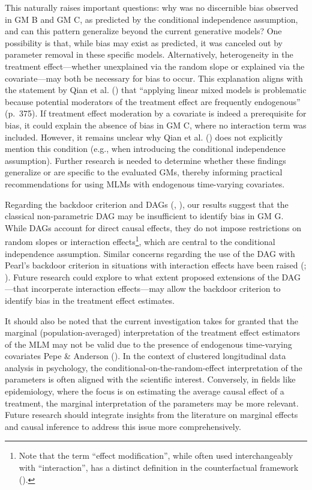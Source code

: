 \documentclass[
  11pt,
  a4paper,
]{article}
\begin{document}
This naturally raises important questions: why was no discernible bias
observed in GM B and GM C, as predicted by the conditional independence
assumption, and can this pattern generalize beyond the current
generative models? One possibility is that, while bias may exist as
predicted, it was canceled out by parameter removal in these specific
models. Alternatively, heterogeneity in the treatment effect---whether
unexplained via the random slope or explained via the covariate---may
both be necessary for bias to occur. This explanation aligns with the
statement by Qian et al. () that ``applying
linear mixed models is problematic because potential moderators of the
treatment effect are frequently endogenous'' (p.~375). If treatment
effect moderation by a covariate is indeed a prerequisite for bias, it
could explain the absence of bias in GM C, where no interaction term was
included. However, it remains unclear why Qian et al.
() does not explicitly mention this
condition (e.g., when introducing the conditional independence
assumption). Further research is needed to determine whether these
findings generalize or are specific to the evaluated GMs, thereby
informing practical recommendations for using MLMs with endogenous
time-varying covariates.

Regarding the backdoor criterion and DAGs
(, ),
our results suggest that the classical non-parametric DAG may be
insufficient to identify bias in GM G. While DAGs account for direct
causal effects, they do not impose restrictions on random slopes or
interaction effects\footnote{Note that the term ``effect modification'',
  while often used interchangeably with ``interaction'', has a distinct
  definition in the counterfactual framework
  ().}, which are
central to the conditional independence assumption. Similar concerns
regarding the use of the DAG with Pearl's backdoor criterion in
situations with interaction effects have been raised
(;
). Future research could
explore to what extent proposed extensions of the DAG---that incorperate
interaction effects---may allow the backdoor criterion to identify bias
in the treatment effect estimates.

It should also be noted that the current investigation takes for granted
that the marginal (population-averaged) interpretation of the treatment
effect estimators of the MLM may not be valid due to the presence of
endogenous time-varying covariates Pepe \& Anderson
(). In the context of clustered
longitudinal data analysis in psychology, the
conditional-on-the-random-effect interpretation of the parameters is
often aligned with the scientific interest. Conversely, in fields like
epidemiology, where the focus is on estimating the average causal effect
of a treatment, the marginal interpretation of the parameters may be
more relevant. Future research should integrate insights from the
literature on marginal effects and causal inference to address this
issue more comprehensively.
\end{document}
